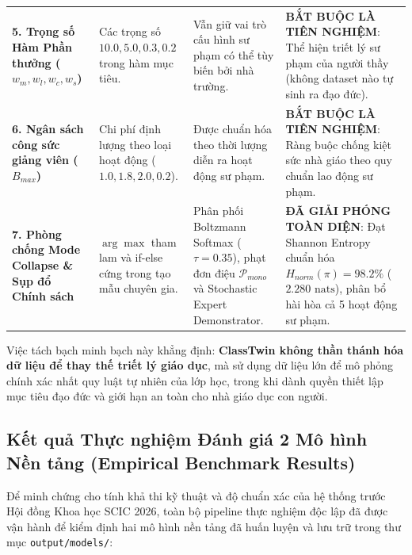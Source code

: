 \begin{table}[htbp]
\begin{tabularx}{\textwidth}{p{3.2cm} p{3.2cm} p{3.8cm} X}
    \addlinespace
    \textbf{5. Trọng số Hàm Phần thưởng ($w_m, w_l, w_c, w_s$)} & Các trọng số $10.0, 5.0, 0.3, 0.2$ trong hàm mục tiêu. & Vẫn giữ vai trò cấu hình sư phạm có thể tùy biến bởi nhà trường. & \textbf{BẮT BUỘC LÀ TIÊN NGHIỆM}: Thể hiện triết lý sư phạm của người thầy (không dataset nào tự sinh ra đạo đức). \\
    \addlinespace
    \addlinespace
    \textbf{6. Ngân sách công sức giảng viên ($B_{max}$)} & Chi phí định lượng theo loại hoạt động ($1.0, 1.8, 2.0, 0.2$). & Được chuẩn hóa theo thời lượng diễn ra hoạt động sư phạm. & \textbf{BẮT BUỘC LÀ TIÊN NGHIỆM}: Ràng buộc chống kiệt sức nhà giáo theo quy chuẩn lao động sư phạm. \\
    \addlinespace
    \textbf{7. Phòng chống Mode Collapse \& Sụp đổ Chính sách} & $\arg\max$ tham lam và if-else cứng trong tạo mẫu chuyên gia. & Phân phối Boltzmann Softmax ($\tau=0.35$), phạt đơn điệu $\mathcal{P}_{mono}$ và Stochastic Expert Demonstrator. & \textbf{ĐÃ GIẢI PHÓNG TOÀN DIỆN}: Đạt Shannon Entropy chuẩn hóa $H_{norm}(\pi) = 98.2\%$ ($2.280\text{ nats}$), phân bổ hài hòa cả 5 hoạt động sư phạm. \\
    \bottomrule
  \end{tabularx}
\end{table}

\noindent Việc tách bạch minh bạch này khẳng định: \textbf{ClassTwin không thần thánh hóa dữ liệu để thay thế triết lý giáo dục}, mà sử dụng dữ liệu lớn để mô phỏng chính xác nhất quy luật tự nhiên của lớp học, trong khi dành quyền thiết lập mục tiêu đạo đức và giới hạn an toàn cho nhà giáo dục con người.

\subsection{Kết quả Thực nghiệm Đánh giá 2 Mô hình Nền tảng (Empirical Benchmark Results)}\label{subsec:empirical-benchmark}
Để minh chứng cho tính khả thi kỹ thuật và độ chuẩn xác của hệ thống trước Hội đồng Khoa học SCIC 2026, toàn bộ pipeline thực nghiệm độc lập đã được vận hành để kiểm định hai mô hình nền tảng đã huấn luyện và lưu trữ trong thư mục \texttt{output/models/}:

